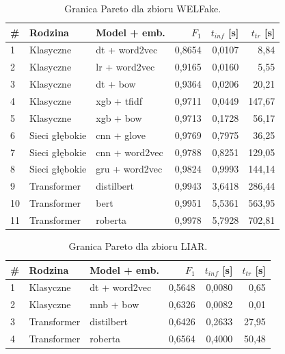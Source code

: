 \documentclass[oneside,polski,logo]{amuthesis}
\begin{document}
\begin{table}[ht]
\centering
\caption{Granica Pareto dla zbioru WELFake.}
\label{tab:pareto_welfake}
\begin{tabular}{lllrrr}
\toprule
\# & Rodzina & Model + emb. & $F_1$ & $t_{inf}$ [s] & $t_{tr}$ [s] \\
\midrule
1 & Klasyczne   & dt + word2vec          & 0,8654 & 0,0107 & 8,84   \\
2 & Klasyczne   & lr + word2vec          & 0,9165 & 0,0160 & 5,55   \\
3 & Klasyczne   & dt + bow               & 0,9364 & 0,0206 & 20,21  \\
4 & Klasyczne   & xgb + tfidf            & 0,9711 & 0,0449 & 147,67 \\
5 & Klasyczne   & xgb + bow              & 0,9713 & 0,1728 & 56,17  \\
6 & Sieci głębokie   & cnn + glove            & 0,9769 & 0,7975 & 36,25  \\
7 & Sieci głębokie   & cnn + word2vec         & 0,9788 & 0,8251 & 129,05 \\
8 & Sieci głębokie   & gru + word2vec         & 0,9824 & 0,9993 & 144,14 \\
9 & Transformer   & distilbert             & 0,9943 & 3,6418 & 286,44 \\
10& Transformer   & bert                   & 0,9951 & 5,5361 & 563,95 \\
11& Transformer   & roberta                & 0,9978 & 5,7928 & 702,81 \\
\bottomrule
\end{tabular}
\end{table}

\begin{table}[ht]
\centering
\caption{Granica Pareto dla zbioru LIAR.}
\label{tab:pareto_liar}
\begin{tabular}{lllrrr}
\toprule
\# & Rodzina & Model + emb. & $F_1$ & $t_{inf}$ [s] & $t_{tr}$ [s] \\
\midrule
1 & Klasyczne   & dt + word2vec          & 0,5648 & 0,0080 & 0,65   \\
2 & Klasyczne   & mnb + bow              & 0,6326 & 0,0082 & 0,01   \\
3 & Transformer   & distilbert             & 0,6426 & 0,2633 & 27,95  \\
4 & Transformer   & roberta                & 0,6564 & 0,4000 & 50,48  \\
\bottomrule
\end{tabular}
\end{table}
\end{document}
